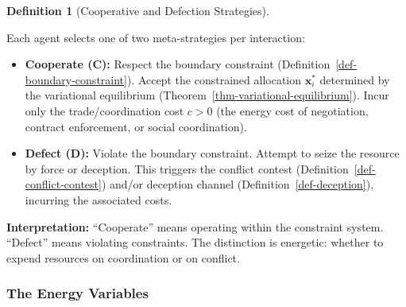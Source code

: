 \documentclass[11pt]{article}
\theoremstyle{plain}
\theoremstyle{definition}
\newtheorem{definition}{Definition}
\theoremstyle{remark}
\let\origsubsubsection\subsubsection
\renewcommand{\subsubsection}{\needspace{4\baselineskip}\origsubsubsection}
\begin{document}
\begin{definition}[Cooperative and Defection Strategies]
\label{def-cooperative-defection-strategies}

Each agent selects one of two meta-strategies per interaction:

\begin{itemize}
\item \textbf{Cooperate (C):} Respect the boundary constraint (Definition~\ref{def-boundary-constraint}). Accept the constrained allocation $\mathbf{x}_i^*$ determined by the variational equilibrium (Theorem~\ref{thm-variational-equilibrium}). Incur only the trade/coordination cost $c > 0$ (the energy cost of negotiation, contract enforcement, or social coordination).
\item \textbf{Defect (D):} Violate the boundary constraint. Attempt to seize the resource by force or deception. This triggers the conflict contest (Definition~\ref{def-conflict-contest}) and/or deception channel (Definition~\ref{def-deception}), incurring the associated costs.
\end{itemize}

\end{definition}

\textbf{Interpretation:} ``Cooperate'' means operating within the
constraint system. ``Defect'' means violating constraints. The
distinction is energetic: whether to expend resources on coordination or
on conflict.

\subsubsection{The Energy Variables}\label{the-energy-variables}
\end{document}
